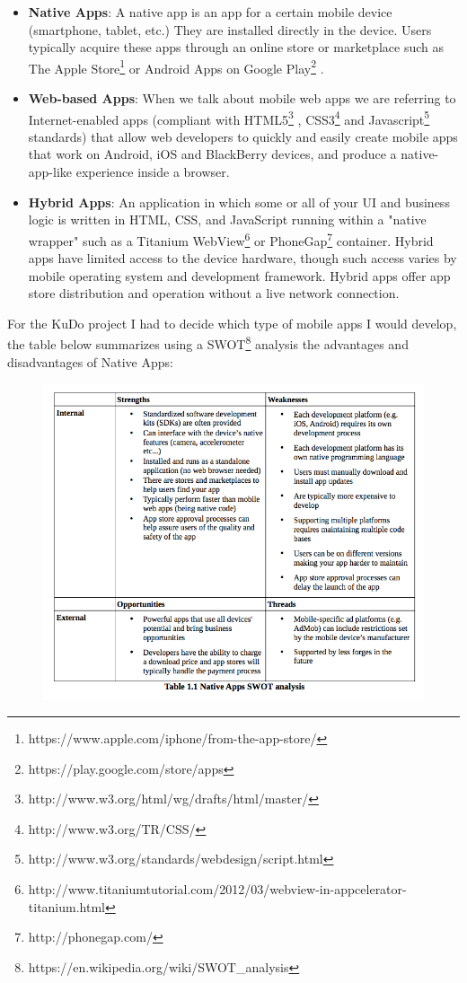 \documentclass[a4paper,12pt]{book}
\begin{document}
\begin{itemize}
 \item \textbf{Native Apps}: A native app is an app for a certain mobile device (smartphone, tablet, etc.) They are installed directly in the device. Users typically acquire these apps through an online store or marketplace such as The Apple Store\footnote{https://www.apple.com/iphone/from-the-app-store/} or Android Apps on Google Play\footnote{https://play.google.com/store/apps} .
 \item \textbf{Web-based Apps}: When we talk about mobile web apps we are referring to Internet-enabled apps (compliant with HTML5\footnote{http://www.w3.org/html/wg/drafts/html/master/} , CSS3\footnote{http://www.w3.org/TR/CSS/} and Javascript\footnote{http://www.w3.org/standards/webdesign/script.html}  standards) that allow web developers to quickly and easily create mobile apps that work on Android, iOS and BlackBerry devices, and produce a native-app-like experience inside a browser. 
 \item \textbf{Hybrid Apps}: An application in which some or all of your UI and business logic is written in HTML, CSS, and JavaScript running within a "native wrapper" such as a Titanium WebView\footnote{http://www.titaniumtutorial.com/2012/03/webview-in-appcelerator-titanium.html} or PhoneGap\footnote{http://phonegap.com/} container. Hybrid apps have limited access to the device hardware, though such access varies by mobile operating system and development framework. Hybrid apps offer app store distribution and operation without a live network connection.
\end{itemize}

\newpage

For the KuDo project I had to decide which type of mobile apps I would develop, the table below summarizes using a SWOT\footnote{https://en.wikipedia.org/wiki/SWOT\_analysis} analysis the advantages and disadvantages of Native Apps:

\begin{figure}[H]
    \centering
    \includegraphics[width=13cm, keepaspectratio]{img/table11.png}
 \end{figure}
\end{document}
